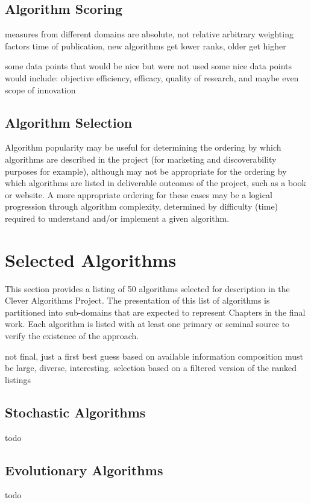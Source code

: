 \documentclass[a4paper, 11pt]{article}
\begin{document}
\subsection{Algorithm Scoring}
measures from different domains are absolute, not relative
arbitrary weighting factors
time of publication, new algorithms get lower ranks, older get higher

some data points that would be nice but were not used
some nice data points would include: objective efficiency, efficacy, quality of research, and maybe even scope of innovation

\subsection{Algorithm Selection}
Algorithm popularity may be useful for determining the ordering by which algorithms are described in the project (for marketing and discoverability purposes for example), although may not be appropriate for the ordering by which algorithms are listed in deliverable outcomes of the project, such as a book or website. A more appropriate ordering for these cases may be a logical progression through algorithm complexity, determined by difficulty (time) required to understand and/or implement a given algorithm.  

% 
% 
\section{Selected Algorithms}
\label{sec:selection}
This section provides a listing of 50 algorithms selected for description in the Clever Algorithms Project. The presentation of this list of algorithms is partitioned into sub-domains that are expected to represent Chapters in the final work. Each algorithm is listed with at least one primary or seminal source to verify the existence of the approach.

not final, just a first best guess based on available information
composition must be large, diverse, interesting. 
selection based on a filtered version of the ranked listings

\subsection{Stochastic Algorithms}
todo

\subsection{Evolutionary Algorithms}
todo
\end{document}
